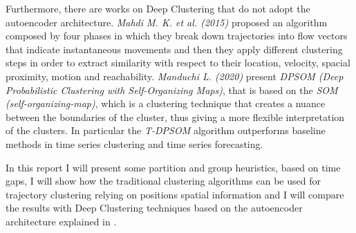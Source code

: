 Furthermore, there are works on Deep Clustering that do not adopt the autoencoder architecture. \textit{Mahdi M. K. et al. (2015)} \cite{MotionPatternApproach} proposed an algorithm composed by four phases in which they break down trajectories into flow vectors that indicate instantaneous movements and then they apply different clustering steps in order to extract similarity with respect to their location, velocity, spacial proximity, motion and reachability. \textit{Manduchi L. (2020)} \cite{DPSOM} present \textit{DPSOM (Deep Probabilistic Clustering with Self-Organizing Maps)}, that is based on the \textit{SOM (self-organizing-map)}, which is a clustering technique that creates a nuance between the boundaries of the cluster, thus giving a more flexible interpretation of the clusters. In particular the \textit{T-DPSOM} algorithm outperforms baseline methods in time series clustering and time series forecasting.

In this report I will present some partition and group heuristics, based on time gaps, I will show how the traditional clustering algorithms can be used for trajectory clustering relying on positions spatial information and I will compare the results with Deep Clustering techniques based on the autoencoder architecture explained in \cite{DeepLearningRepresentation}. 
